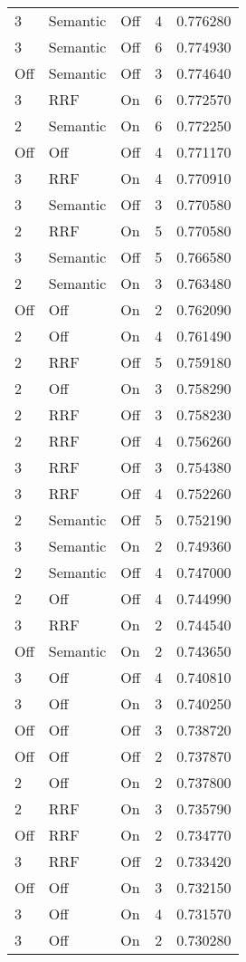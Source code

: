 \begin{tabular}{llllr}
3 & Semantic & Off & 4 & 0.776280 \\
3 & Semantic & Off & 6 & 0.774930 \\
Off & Semantic & Off & 3 & 0.774640 \\
3 & RRF & On & 6 & 0.772570 \\
2 & Semantic & On & 6 & 0.772250 \\
Off & Off & Off & 4 & 0.771170 \\
3 & RRF & On & 4 & 0.770910 \\
3 & Semantic & Off & 3 & 0.770580 \\
2 & RRF & On & 5 & 0.770580 \\
3 & Semantic & Off & 5 & 0.766580 \\
2 & Semantic & On & 3 & 0.763480 \\
Off & Off & On & 2 & 0.762090 \\
2 & Off & On & 4 & 0.761490 \\
2 & RRF & Off & 5 & 0.759180 \\
2 & Off & On & 3 & 0.758290 \\
2 & RRF & Off & 3 & 0.758230 \\
2 & RRF & Off & 4 & 0.756260 \\
3 & RRF & Off & 3 & 0.754380 \\
3 & RRF & Off & 4 & 0.752260 \\
2 & Semantic & Off & 5 & 0.752190 \\
3 & Semantic & On & 2 & 0.749360 \\
2 & Semantic & Off & 4 & 0.747000 \\
2 & Off & Off & 4 & 0.744990 \\
3 & RRF & On & 2 & 0.744540 \\
Off & Semantic & On & 2 & 0.743650 \\
3 & Off & Off & 4 & 0.740810 \\
3 & Off & On & 3 & 0.740250 \\
Off & Off & Off & 3 & 0.738720 \\
Off & Off & Off & 2 & 0.737870 \\
2 & Off & On & 2 & 0.737800 \\
2 & RRF & On & 3 & 0.735790 \\
Off & RRF & On & 2 & 0.734770 \\
3 & RRF & Off & 2 & 0.733420 \\
Off & Off & On & 3 & 0.732150 \\
3 & Off & On & 4 & 0.731570 \\
3 & Off & On & 2 & 0.730280 \\

\end{tabular}
